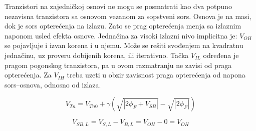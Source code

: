 Tranzistori na zajedničkoj osnovi ne mogu se posmatrati kao dva potpuno nezavisna tranzistora sa osnovom vezanom za sopstveni sors. Osnova je na masi, dok je sors opterećenja na izlazu. Zato se prag opterećenja menja sa izlaznim naponom usled efekta osnove. Jednačina za visoki izlazni nivo implicitna je: $V_{OH}$ se pojavljuje i izvan korena i u njemu. Može se rešiti svođenjem na kvadratnu jednačinu, uz proveru dobijenih korena, ili iterativno. Tačka $V_{IL}$ određena je pragom pogonskog tranzistora, pa u ovom razmatranju ne zavisi od praga opterećenja. Za $V_{IH}$ treba uzeti u obzir zavisnost praga opterećenja od napona sors–osnova, odnosno od izlaza.

\[V_{Tn}=V_{Tn0}+\gamma\left(\sqrt{|2\phi_F+V_{SB}|}-\sqrt{|2\phi_F|}\right)\]

\[V_{SB,L}=V_{S,L}-V_{B,L}=V_{OH}-0=V_{OH}\]

